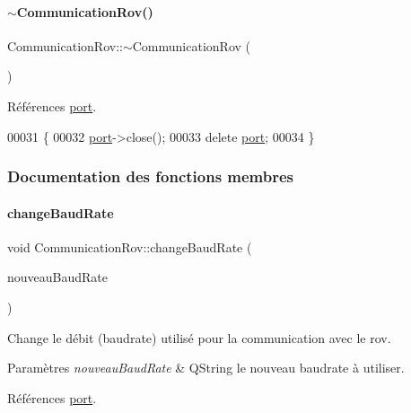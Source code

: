 \paragraph{\texorpdfstring{$\sim$\+Communication\+Rov()}{~CommunicationRov()}}
{\footnotesize\ttfamily Communication\+Rov\+::$\sim$\+Communication\+Rov (\begin{DoxyParamCaption}{ }\end{DoxyParamCaption})}



Références \hyperlink{class_communication_rov_a21b62067ef0b2a6aec339df60b4abd72}{port}.


\begin{DoxyCode}
00031 \{
00032     \hyperlink{class_communication_rov_a21b62067ef0b2a6aec339df60b4abd72}{port}->close();
00033     \textcolor{keyword}{delete} \hyperlink{class_communication_rov_a21b62067ef0b2a6aec339df60b4abd72}{port};
00034 \}
\end{DoxyCode}


\subsubsection{Documentation des fonctions membres}
\mbox{\label{class_communication_rov_ac49ffc6f2e6ae22ea9f99e10ca0a4163}} 
\paragraph{\texorpdfstring{change\+Baud\+Rate}{changeBaudRate}}
{\footnotesize\ttfamily void Communication\+Rov\+::change\+Baud\+Rate (\begin{DoxyParamCaption}\item[{Q\+String}]{nouveau\+Baud\+Rate }\end{DoxyParamCaption})\hspace{0.3cm}{\ttfamily [slot]}}

Change le débit (baudrate) utilisé pour la communication avec le rov.


\begin{DoxyParams}{Paramètres}
{\em nouveau\+Baud\+Rate} & Q\+String le nouveau baudrate à utiliser. \\
\hline
\end{DoxyParams}


Références \hyperlink{class_communication_rov_a21b62067ef0b2a6aec339df60b4abd72}{port}.



